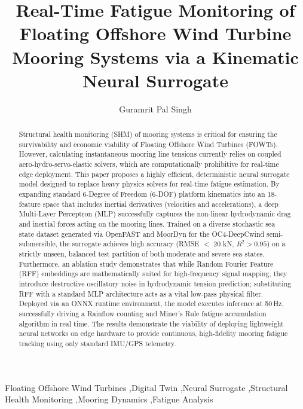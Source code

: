 \documentclass[preprint,12pt]{elsarticle}
\begin{document}
\begin{frontmatter}

\title{Real-Time Fatigue Monitoring of Floating Offshore Wind Turbine Mooring Systems via a Kinematic Neural Surrogate}

\author[1]{Guramrit Pal Singh}


\begin{abstract}
Structural health monitoring (SHM) of mooring systems is critical for ensuring the survivability and economic viability of Floating Offshore Wind Turbines (FOWTs). However, calculating instantaneous mooring line tensions currently relies on coupled aero-hydro-servo-elastic solvers, which are computationally prohibitive for real-time edge deployment. This paper proposes a highly efficient, deterministic neural surrogate model designed to replace heavy physics solvers for real-time fatigue estimation. By expanding standard 6-Degree of Freedom (6-DOF) platform kinematics into an 18-feature space that includes inertial derivatives (velocities and accelerations), a deep Multi-Layer Perceptron (MLP) successfully captures the non-linear hydrodynamic drag and inertial forces acting on the mooring lines. Trained on a diverse stochastic sea state dataset generated via OpenFAST and MoorDyn for the OC4-DeepCwind semi-submersible, the surrogate achieves high accuracy (RMSE $<$ 20 kN, $R^2 > 0.95$) on a strictly unseen, balanced test partition of both moderate and severe sea states. Furthermore, an ablation study demonstrates that while Random Fourier Feature (RFF) embeddings are mathematically suited for high-frequency signal mapping, they introduce destructive oscillatory noise in hydrodynamic tension prediction; substituting RFF with a standard MLP architecture acts as a vital low-pass physical filter. Deployed via an ONNX runtime environment, the model executes inference at 50\,Hz, successfully driving a Rainflow counting and Miner's Rule fatigue accumulation algorithm in real time. The results demonstrate the viability of deploying lightweight neural networks on edge hardware to provide continuous, high-fidelity mooring fatigue tracking using only standard IMU/GPS telemetry.
\end{abstract}

\begin{keyword}
Floating Offshore Wind Turbines \sep Digital Twin \sep Neural Surrogate \sep Structural Health Monitoring \sep Mooring Dynamics \sep Fatigue Analysis
\end{keyword}

\end{frontmatter}
\end{document}
